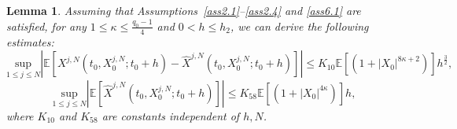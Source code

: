 \documentclass[12pt]{article}
\numberwithin{equation}{section}
\newtheorem{lemma}[assumption]{Lemma}
\begin{document}
\begin{lemma}\label{lemma6.6}
    Assuming that Assumptions~\ref{ass2.1}--\ref{ass2.4} and \ref{ass6.1} are satisfied, for any $1 \leq \kappa \leq \tfrac{q_0 - 1}{4}$ and $0 < h \leq h_2$, we can derive the following estimates:
\begin{equation}\tag{5.131}\label{6.32}
\underset{1\leqslant j\leqslant N}{\mathrm{sup}}\left|\mathbb{E}\left [X^{j,N}\left( t_0,X^{j,N}_0;t_0+h \right) -\hat{X}^{j,N}\left( t_0,X^{j,N}_0;t_0+h \right) \right]\right|\le K_{10}\mathbb{E} \left[\left( 1+\left|X_0\right|^{8\kappa+2}\right) \right] h^{\frac{3}{2}},
\end{equation}
\begin{equation}\tag{5.132}\label{6.33}
\underset{1\leqslant j\leqslant N}{\mathrm{sup}}\left|\mathbb{E}\left [\hat{X}^{j,N}\left( t_0,X^{j,N}_0;t_0+h \right) \right]\right|\le K_{58}\mathbb{E} \left[ \left(1+\left|X_0\right|^{4\kappa}\right) \right] h,
\end{equation}
where $ K_{10}$ and $ K_{58}$ are constants independent of $h, N$.
\end{lemma}
\end{document}
